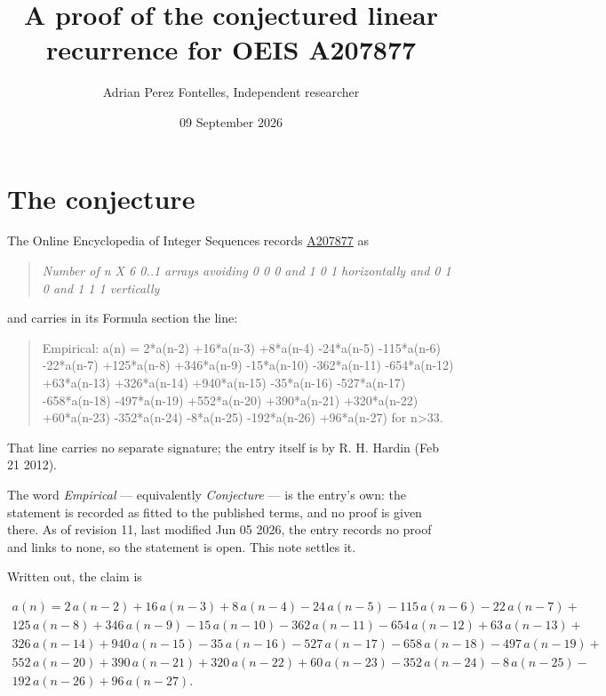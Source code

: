 \documentclass[11pt]{article}
\title{A proof of the conjectured linear recurrence for OEIS A207877}
\author{Adrian Perez Fontelles, Independent researcher}
\date{09 September 2026}
\theoremstyle{definition}
\begin{document}
\maketitle
\section{The conjecture}

The Online Encyclopedia of Integer Sequences records \href{https://oeis.org/A207877}{A207877} as

\begin{quote}\itshape Number of n X 6 0..1 arrays avoiding 0 0 0 and 1 0 1 horizontally and 0 1 0 and 1 1 1 vertically\end{quote}

and carries in its Formula section the line:

\begin{quote}\ttfamily Empirical: a(n) = 2*a(n-2) +16*a(n-3) +8*a(n-4) -24*a(n-5) -115*a(n-6) -22*a(n-7) +125*a(n-8) +346*a(n-9) -15*a(n-10) -362*a(n-11) -654*a(n-12) +63*a(n-13) +326*a(n-14) +940*a(n-15) -35*a(n-16) -527*a(n-17) -658*a(n-18) -497*a(n-19) +552*a(n-20) +390*a(n-21) +320*a(n-22) +60*a(n-23) -352*a(n-24) -8*a(n-25) -192*a(n-26) +96*a(n-27) for n>33.\end{quote}

That line carries no separate signature; the entry itself is by R. H. Hardin (Feb 21 2012).

The word {\itshape Empirical} --- equivalently {\itshape Conjecture} --- is the entry's own: the statement is recorded as fitted to the published terms, and no proof is given there. As of revision 11, last modified Jun 05 2026, the entry records no proof and links to none, so the statement is open. This note settles it.

Written out, the claim is

\begin{multline*} a(n) = 2\,a(n-2) + 16\,a(n-3) + 8\,a(n-4) - 24\,a(n-5) - 115\,a(n-6) - 22\,a(n-7) + \\ 125\,a(n-8) + 346\,a(n-9) - 15\,a(n-10) - 362\,a(n-11) - 654\,a(n-12) + 63\,a(n-13) + \\ 326\,a(n-14) + 940\,a(n-15) - 35\,a(n-16) - 527\,a(n-17) - 658\,a(n-18) - 497\,a(n-19) + \\ 552\,a(n-20) + 390\,a(n-21) + 320\,a(n-22) + 60\,a(n-23) - 352\,a(n-24) - 8\,a(n-25) - \\ 192\,a(n-26) + 96\,a(n-27). \end{multline*}
\end{document}
